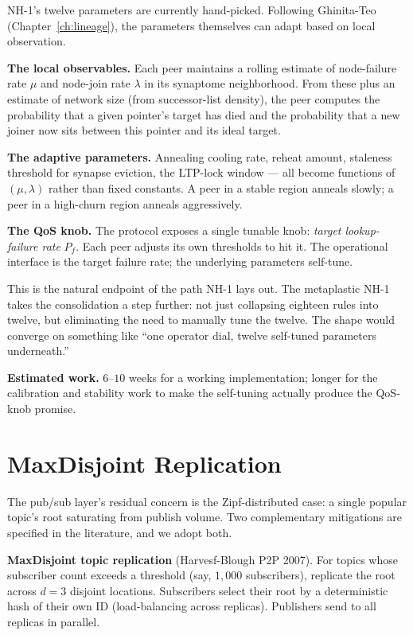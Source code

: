\documentclass[twoside,nobib]{tufte-book}
\begin{document}
NH-1's twelve parameters are currently hand-picked. Following
Ghinita-Teo (Chapter~\ref{ch:lineage}), the parameters
themselves can adapt based on local observation.

\textbf{The local observables.} Each peer maintains a rolling
estimate of node-failure rate $\mu$ and node-join rate $\lambda$
in its synaptome neighborhood. From these plus an estimate of
network size (from successor-list density), the peer computes
the probability that a given pointer's target has died and the
probability that a new joiner now sits between this pointer and
its ideal target.

\textbf{The adaptive parameters.} Annealing cooling rate, reheat
amount, staleness threshold for synapse eviction, the LTP-lock
window --- all become functions of $(\mu, \lambda)$ rather than
fixed constants. A peer in a stable region anneals slowly; a
peer in a high-churn region anneals aggressively.

\textbf{The QoS knob.} The protocol exposes a single tunable
knob: \emph{target lookup-failure rate} $P_f$. Each peer adjusts
its own thresholds to hit it. The operational interface is the
target failure rate; the underlying parameters self-tune.

This is the natural endpoint of the path NH-1 lays out. The
metaplastic NH-1 takes the consolidation a step further: not
just collapsing eighteen rules into twelve, but eliminating the
need to manually tune the twelve. The shape would converge on
something like ``one operator dial, twelve self-tuned
parameters underneath.''

\textbf{Estimated work.} $6$--$10$ weeks for a working
implementation; longer for the calibration and stability work to
make the self-tuning actually produce the QoS-knob promise.

\section{MaxDisjoint Replication}

The pub/sub layer's residual concern is the Zipf-distributed
case: a single popular topic's root saturating from publish
volume. Two complementary mitigations are specified in the
literature, and we adopt both.

\textbf{MaxDisjoint topic replication} (Harvesf-Blough P2P 2007).
For topics whose subscriber count exceeds a threshold (say,
$1{,}000$ subscribers), replicate the root across $d = 3$
disjoint locations. Subscribers select their root by a
deterministic hash of their own ID (load-balancing across
replicas). Publishers send to all replicas in parallel.
\end{document}
